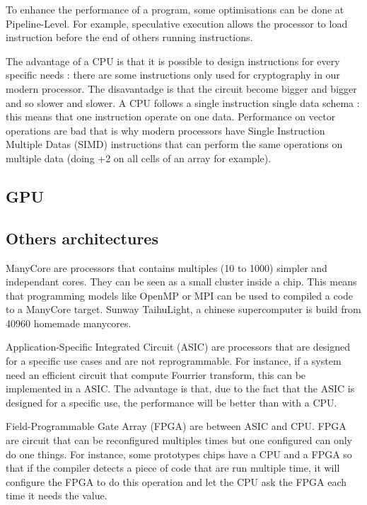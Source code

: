 
To enhance the performance of a program, some optimisations can be done at Pipeline-Level. For example, speculative execution allows the processor to load instruction before the end of others running instructions. 

The advantage of a CPU is that it is possible to design instructions for every specific needs : there are some instructions only used for cryptography in our modern processor. The disavantadge is that the circuit become bigger and bigger and so slower and slower. A CPU follows a single instruction single data  schema : this means that one instruction operate on one data. Performance on vector operations are bad that is why modern processors have Single Instruction Multiple Datas (SIMD) instructions that can perform the same operations on multiple data (doing +2 on all cells of an array for example).

\subsection{GPU}

\subsection{Others architectures}
ManyCore are processors that contains multiples (10 to 1000) simpler and independant cores. They can be seen as a small cluster inside a chip. This means that programming models like OpenMP or MPI can be used to compiled a code to a ManyCore target. Sunway TaihuLight, a chinese supercomputer is build from 40960 homemade manycores.

Application-Specific Integrated Circuit (ASIC) are processors that are designed for a specific use cases and are not reprogrammable. For instance, if a system need an efficient circuit that compute Fourrier transform, this can be implemented in a ASIC. The advantage is that, due to the fact that the ASIC is designed for a specific use, the performance will be better than with a CPU.

Field-Programmable Gate Array (FPGA) are between ASIC and CPU. FPGA are circuit that can be reconfigured multiples times but one configured can only do one things. For instance, some prototypes chips have a CPU and a FPGA so that if the compiler detects a piece of code that are run multiple time, it will configure the FPGA to do this operation and let the CPU ask the FPGA each time it needs the value.  

